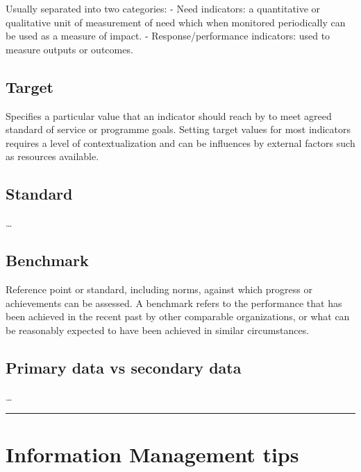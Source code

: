 \documentclass[
  a4paper,
  onecolumn,
  oneside]{book}
\begin{document}
Usually separated into two categories: - Need indicators: a quantitative
or qualitative unit of measurement of need which when monitored
periodically can be used as a measure of impact. - Response/performance
indicators: used to measure outputs or outcomes.

\hypertarget{target}{%
\subsection{Target}\label{target}}

Specifies a particular value that an indicator should reach by to meet
agreed standard of service or programme goals. Setting target values for
most indicators requires a level of contextualization and can be
influences by external factors such as resources available.

\hypertarget{standard}{%
\subsection{Standard}\label{standard}}

\ldots{}

\hypertarget{benchmark}{%
\subsection{Benchmark}\label{benchmark}}

Reference point or standard, including norms, against which progress or
achievements can be assessed. A benchmark refers to the performance that
has been achieved in the recent past by other comparable organizations,
or what can be reasonably expected to have been achieved in similar
circumstances.

\hypertarget{primary-data-vs-secondary-data}{%
\subsection{Primary data vs secondary
data}\label{primary-data-vs-secondary-data}}

\ldots{}

\begin{center}\rule{0.5\linewidth}{0.5pt}\end{center}

\hypertarget{information-management-tips}{%
\section{Information Management
tips}\label{information-management-tips}}
\end{document}
